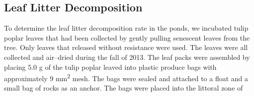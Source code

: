 \subsection{Leaf Litter Decomposition}

To determine the leaf litter decomposition rate in the ponds, we incubated tulip poplar leaves that had been collected by gently pulling senescent leaves from the tree. Only leaves that released without resistance were used.  The leaves were all collected and air--dried during the fall of 2013.  The leaf packs were assembled by placing 5.0 g of the tulip poplar leaved into plastic produce bags with approximately 9 mm\textsuperscript{2} mesh. The bags were sealed and attached to a float and a small bag of rocks as an anchor.  The bags were placed into the littoral zone of 